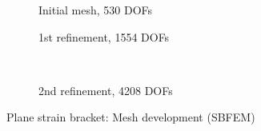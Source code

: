 \begin{figure}[h!]
    \centering
    \begin{subfigure}[b]{0.4\linewidth}
        \centering
        \caption{Initial mesh, 530 DOFs}
    \end{subfigure}
    \begin{subfigure}[b]{0.4\linewidth}
        \centering
        \caption{1st refinement, 1554 DOFs}
    \end{subfigure} \\
    \begin{subfigure}[b]{1\linewidth}
        \centering
        \caption{2nd refinement, 4208 DOFs}
    \end{subfigure}
    \caption{Plane strain bracket: Mesh development (SBFEM)}
    \label{adap_fig:ex_bracket_mesh_sbfem}
\end{figure}


